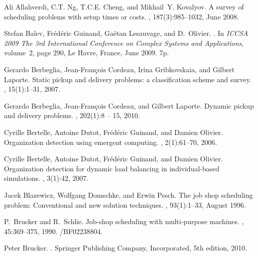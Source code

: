 \documentclass[review]{elsarticle}
\begin{document}

\begin{thebibliography}{10}

Ali Allahverdi, C.T. Ng, T.C.E. Cheng, and Mikhail~Y. Kovalyov.
\newblock A survey of scheduling problems with setup times or costs.
, 187(3):985--1032,
  June 2008.

Stefan Balev, Fr{\'e}d{\'e}ric Guinand, Ga{\"e}tan Lesauvage, and D.~Olivier.
.
\newblock In {\em {ICCSA 2009 The 3rd International Conference on Complex
  Systems and Applications}}, volume~2, page 290, Le Havre, France, June 2009.
\newblock 7p.

Gerardo Berbeglia, Jean-François Cordeau, Irina Gribkovskaia, and Gilbert
  Laporte.
\newblock Static pickup and delivery problems: a classification scheme and
  survey.
, 15(1):1--31, 2007.

Gerardo Berbeglia, Jean-François Cordeau, and Gilbert Laporte.
\newblock Dynamic pickup and delivery problems.
, 202(1):8 -- 15, 2010.

Cyrille Bertelle, Antoine Dutot, Frédéric Guinand, and Damien Olivier.
\newblock Organization detection using emergent computing.
,
  2(1):61--70, 2006.

Cyrille Bertelle, Antoine Dutot, Frédéric Guinand, and Damien Olivier.
\newblock Organization detection for dynamic load balancing in individual-based
  simulations.
, 3(1):42, 2007.

Jacek Blazewicz, Wolfgang Domschke, and Erwin Pesch.
\newblock The job shop scheduling problem: Conventional and new solution
  techniques.
, 93(1):1--33, August
  1996.

P.~Brucker and R.~Schlie.
\newblock Job-shop scheduling with multi-purpose machines.
, 45:369--375, 1990.
/BF02238804.

Peter Brucker.
.
\newblock Springer Publishing Company, Incorporated, 5th edition, 2010.


\end{thebibliography}
\end{document}
